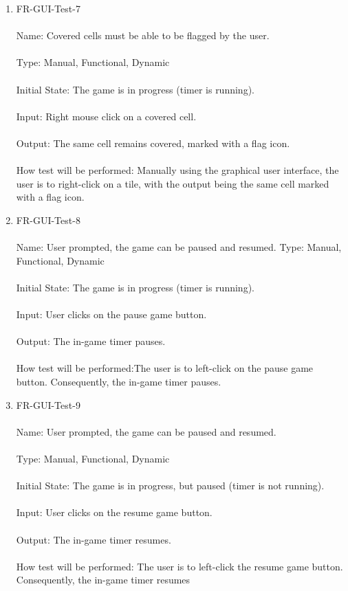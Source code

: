 \documentclass[12pt, titlepage]{article}
\begin{document}
\begin{enumerate}
\item{FR-GUI-Test-7\\\\}
Name: Covered cells must be able to be flagged by the user.\\\\
Type: Manual, Functional, Dynamic\\\\
Initial State: The game is in progress (timer is running).\\\\
Input: Right mouse click on a covered cell.\\\\
Output: The same cell remains covered, marked with a flag icon.\\\\
How test will be performed: Manually using the graphical user interface, the user is to right-click on a tile, with the output being the same cell marked with a flag icon.\\

\item{FR-GUI-Test-8\\\\}
Name: User prompted, the game can be paused and resumed.
Type: Manual, Functional, Dynamic\\\\
Initial State: The game is in progress (timer is running).\\\\
Input: User clicks on the pause game button.\\\\
Output: The in-game timer pauses.\\\\
How test will be performed:The user is to left-click on the pause game button. Consequently, the in-game timer pauses.\\

\item{FR-GUI-Test-9\\\\}
Name: User prompted, the game can be paused and resumed.\\\\
Type: Manual, Functional, Dynamic\\\\
Initial State: The game is in progress, but paused (timer is not running).\\\\
Input: User clicks on the resume game button.\\\\
Output: The in-game timer resumes.\\\\
How test will be performed: The user is to left-click the resume game button. Consequently, the in-game timer resumes\\

\end{enumerate}
\end{document}
